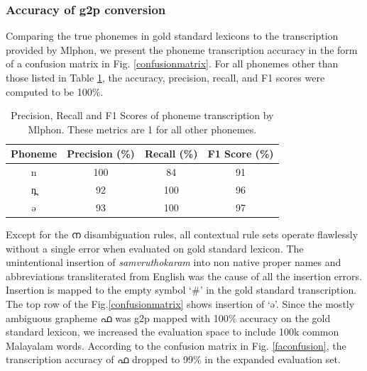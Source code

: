 \documentclass{ieeeaccess}
\begin{document}
\subsubsection{Accuracy of g2p conversion }

Comparing the true phonemes in gold standard lexicons to the transcription provided by Mlphon, we present the phoneme transcription accuracy in the form of a confusion matrix in Fig. \ref{confusionmatrix}. For all phonemes other than those listed in Table \ref{precision}, the accuracy, precision, recall, and F1 scores were computed to be 100\%.
\vspace{0.2cm}

\begin{table}[h]
	\begin{center}
			\caption{Precision, Recall and F1 Scores of phoneme transcription by Mlphon. These metrics are 1 for all other phonemes.}
			\label{precision}
			\begin{tabular}{@{}cccc@{}}
				\hline\hline
				Phoneme  & Precision (\%) & Recall (\%) & F1 Score (\%) \\
				\hline
				{\ipa n} & 100      & 84   &  91     \\
				{\ipa n̪} &92     & 100   & 96   \\
				{\ipa ə} & 93     & 100   &  97     \\

				\hline
			\end{tabular}
	\end{center}
\end{table}


Except for the {\mal ന} disambiguation rules, all contextual rule sets operate flawlessly without a single error when evaluated on gold standard lexicon. The unintentional insertion of \textit{samvruthokaram} into non native proper names and abbreviations transliterated from English was the cause of all the insertion errors.  Insertion is mapped to the empty symbol `\#' in the gold standard transcription.  The top row of the Fig.\ref{confusionmatrix} shows insertion of `{\ipa ə}'. 
Since the mostly ambiguous  grapheme {\mal ഫ} was g2p mapped with 100\% accuracy on the gold standard lexicon, we increased the evaluation space to include 100k common Malayalam words.
According to the confusion matrix in Fig. \ref{faconfusion}, the transcription accuracy of {\mal ഫ} dropped to 99\% in the expanded evaluation set. 
\end{document}
